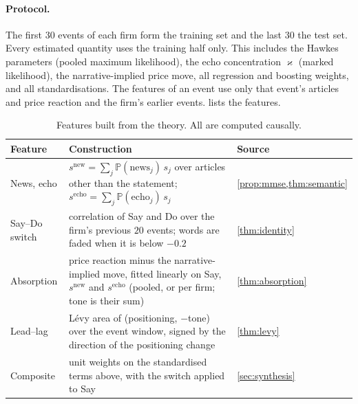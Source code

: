 \documentclass[11pt,a4paper]{article}
\theoremstyle{plain}
\theoremstyle{definition}
\theoremstyle{remark}
\newcommand{\Prob}{\mathbb{P}}
\begin{document}
\paragraph{Protocol.} The first $30$ events of each firm form the training set and the last $30$ the test set. Every estimated quantity uses the training half only. This includes the Hawkes parameters (pooled maximum likelihood), the echo concentration $\varkappa$ (marked likelihood), the narrative-implied price move, all regression and boosting weights, and all standardisations. The features of an event use only that event's articles and price reaction and the firm's earlier events.  lists the features.

\begin{table}[ht]
\centering
\caption{Features built from the theory. All are computed causally.}
\label{tab:features}
\small
\begin{tabularx}{\textwidth}{@{}l>{\raggedright\arraybackslash}Xl@{}}
\toprule
Feature & Construction & Source \\
\midrule
News, echo & $s^{\text{new}}=\sum_j\Prob(\text{news}_j)\,s_j$ over articles other than the statement; $s^{\text{echo}}=\sum_j\Prob(\text{echo}_j)\,s_j$ & \cref{prop:mmse,thm:semantic} \\
Say--Do switch & correlation of Say and Do over the firm's previous $20$ events; words are faded when it is below $-0.2$ & \cref{thm:identity} \\
Absorption & price reaction minus the narrative-implied move, fitted linearly on Say, $s^{\text{new}}$ and $s^{\text{echo}}$ (pooled, or per firm; tone is their sum) & \cref{thm:absorption} \\
Lead--lag & L\'evy area of (positioning, $-$tone) over the event window, signed by the direction of the positioning change & \cref{thm:levy} \\
Composite & unit weights on the standardised terms above, with the switch applied to Say & \cref{sec:synthesis} \\
\bottomrule
\end{tabularx}
\end{table}
\end{document}
